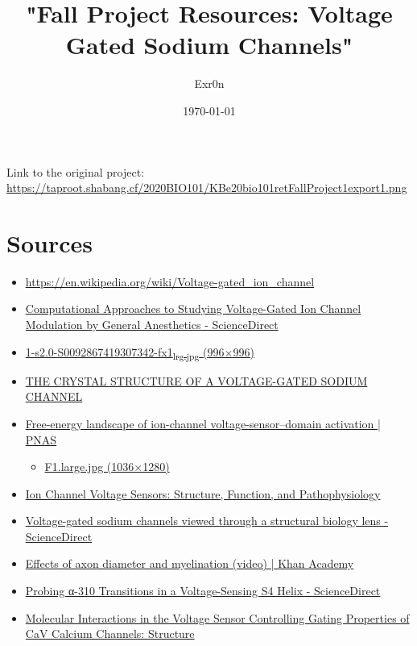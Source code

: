 \documentclass[letterpaper]{article}
\author{Exr0n}
\date{\today}
\title{"Fall Project Resources: Voltage Gated Sodium Channels"}
\renewcommand\maketitle{}
\begin{document}
\maketitle
Link to the original project: \url{https://taproot.shabang.cf/2020BIO101/KBe20bio101retFallProject1export1.png}

\section{Sources}
\label{sec:orgb907e77}
\begin{itemize}
\item \url{https://en.wikipedia.org/wiki/Voltage-gated\_ion\_channel}
\item \href{https://www.sciencedirect.com/science/article/pii/S0076687918300156}{Computational Approaches to Studying Voltage-Gated Ion Channel Modulation by General Anesthetics - ScienceDirect}
\item \href{https://ars.els-cdn.com/content/image/1-s2.0-S0092867419307342-fx1\_lrg.jpg}{1-s2.0-S0092867419307342-fx1\textsubscript{lrg.jpg} (996×996)}
\item \href{https://www.ncbi.nlm.nih.gov/pmc/articles/PMC3266868/}{THE CRYSTAL STRUCTURE OF A VOLTAGE-GATED SODIUM CHANNEL}
\item \href{https://www.pnas.org/content/112/1/124/tab-figures-data}{Free-energy landscape of ion-channel voltage-sensor–domain activation | PNAS}
\begin{itemize}
\item \href{https://www.pnas.org/content/pnas/112/1/124/F1.large.jpg}{F1.large.jpg (1036×1280)}
\end{itemize}
\item \href{https://www.ncbi.nlm.nih.gov/pmc/articles/PMC2950829/}{Ion Channel Voltage Sensors: Structure, Function, and Pathophysiology}
\item \href{https://www.sciencedirect.com/science/article/abs/pii/S0959440X16301506}{Voltage-gated sodium channels viewed through a structural biology lens - ScienceDirect}
\item \href{https://www.khanacademy.org/science/health-and-medicine/nervous-system-and-sensory-infor/neuron-membrane-potentials-topic/v/effects-of-axon-diameter-and-myelination}{Effects of axon diameter and myelination (video) | Khan Academy}
\item \href{https://www.sciencedirect.com/science/article/pii/S0006349514007875}{Probing α-310 Transitions in a Voltage-Sensing S4 Helix - ScienceDirect}
\item \href{https://www.cell.com/structure/fulltext/S0969-2126(15)00500-6?\_returnURL=https\%3A\%2F\%2Flinkinghub.elsevier.com\%2Fretrieve\%2Fpii\%2FS0969212615005006\%3Fshowall\%3Dtrue}{Molecular Interactions in the Voltage Sensor Controlling Gating Properties of CaV Calcium Channels: Structure}

\end{itemize}
\end{document}
